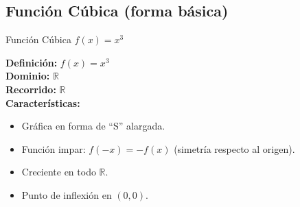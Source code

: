 \documentclass[12pt,a4paper]{article}
\begin{document}
\subsection{Función Cúbica (forma básica)}
\begin{funcbox}{Función Cúbica $f(x)=x^3$}
\begin{minipage}[t]{0.55\textwidth}
    \textbf{Definición:} $f(x)=x^3$\\
    \textbf{Dominio:} $\mathbb{R}$\\
    \textbf{Recorrido:} $\mathbb{R}$\\
    \textbf{Características:}
    \begin{itemize}
        \item Gráfica en forma de ``S'' alargada.
        \item Función impar: $f(-x)=-f(x)$ (simetría respecto al origen).
        \item Creciente en todo $\mathbb{R}$.
        \item Punto de inflexión en $(0,0)$.
    \end{itemize}
\end{minipage}\hfill
\begin{minipage}[t]{0.4\textwidth}
    \centering
\end{minipage}
\end{funcbox}

\end{document}
